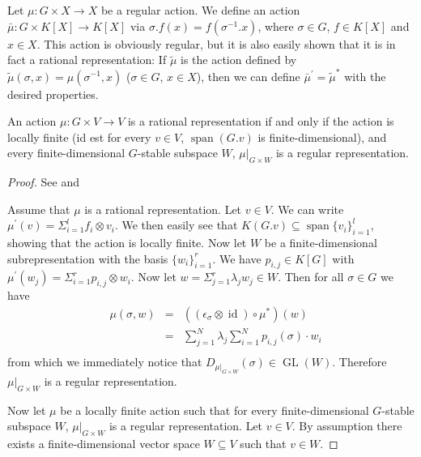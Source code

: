 \begin{definition}
  Let $\mu \colon G \times X \longrightarrow X$ be a regular action.
  We define an action $\bar{\mu} \colon G \times K[X] \longrightarrow K[X]$ via $\sigma.f (x) = f( \sigma^{-1}.x )$, where  $\sigma \in G$, $f \in K[X]$ and $x \in X$.
  This action is obviously regular, but it is also easily shown that it is in fact a rational representation:
  If $\tilde{\mu}$ is the action defined by $ \tilde{\mu} (\sigma,x) = \mu (\sigma^{-1},x)$ ($\sigma \in G$, $x \in X$), then we can define $ \bar{\mu}^\prime = \tilde{\mu}^\ast $ with the desired properties.
\end{definition}

\begin{proposition}
  An action $\mu \colon G \times V \longrightarrow V$ is a rational representation if and only if the action is locally finite (id est for every $v \in V$, $\operatorname{span}(G.v)$ is finite-dimensional), and every finite-dimensional $G$-stable subspace $W$, $\left. \mu \right|_{G\times W}$ is a regular representation.
\end{proposition}

\begin{proof}
  See \cite[A.1.8]{DK15} and \cite[2.2.5(b)$\implies$(c),2.2.6]{DK15}

  Assume that $\mu$ is a rational representation.
  Let $v \in V$.
  We can write $\mu^\prime (v) = \Sigma_{i=1}^l f_i \otimes v_i$. %
  We then easily see that $K(G.v) \subseteq \operatorname{span}\{v_i\}_{i=1}^l$, showing that the action is locally finite.
  Now let $W$ be a finite-dimensional subrepresentation with the basis $\{w_i\}_{i=1}^r$.
  We have $p_{i,j} \in K[G]$ with $ \mu^\prime (w_j) = \Sigma_{i=1}^r p_{i,j} \otimes w_i$.
  Now let $w = \Sigma_{j=1}^r \lambda_j w_j \in W$.
  Then for all $\sigma \in G$ we have
  \begin{equation}
    \begin{aligned}
      &\mu (\sigma,w)
      &=& \left(\left(\epsilon_\sigma \otimes \operatorname{id} \right) \circ \mu^\ast \right) \left(w \right) \\
      &&=& \sum_{j=1}^N \lambda_j  \sum_{i=1}^N p_{i,j}\left(\sigma\right) \cdot w_i \\
    \end{aligned}
  \end{equation}
  from which we immediately notice that $D_{\left. \mu \right|_{G \times W}} (\sigma) \in \operatorname{GL}(W)$.
  Therefore $\left. \mu \right|_{G\times W}$ is a regular representation.

  Now let $\mu$ be a locally finite action such that for every finite-dimensional $G$-stable subspace $W$, $\left. \mu \right|_{G\times W}$ is a regular representation.
  Let $v \in V$.
  By assumption there exists a finite-dimensional vector space $W \subseteq V$ such that $v \in W$.
  
\end{proof}

